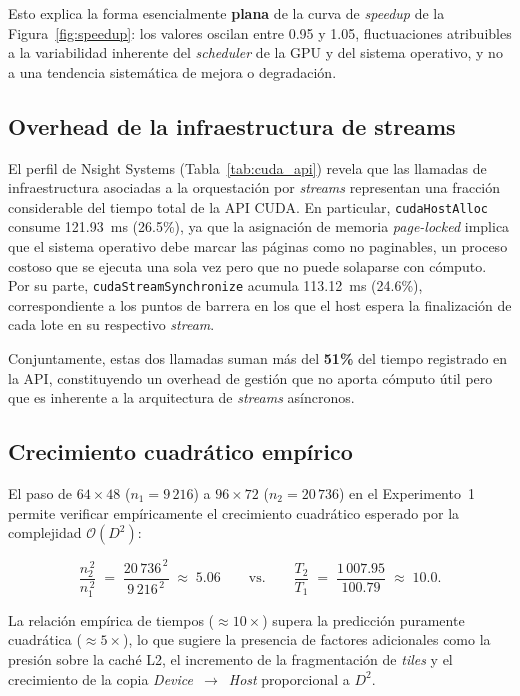 \documentclass[12pt, a4paper]{article}
\begin{document}
Esto explica la forma esencialmente \textbf{plana} de la curva de
\textit{speedup} de la Figura~\ref{fig:speedup}: los valores oscilan entre
0.95 y 1.05, fluctuaciones atribuibles a la variabilidad inherente del
\textit{scheduler} de la GPU y del sistema operativo, y no a una tendencia
sistemática de mejora o degradación.

\subsection{Overhead de la infraestructura de streams}

El perfil de Nsight Systems (Tabla~\ref{tab:cuda_api}) revela que las
llamadas de infraestructura asociadas a la orquestación por \textit{streams}
representan una fracción considerable del tiempo total de la API CUDA.
En particular, \texttt{cudaHostAlloc} consume 121.93~ms (26.5\%), ya que la
asignación de memoria \textit{page-locked} implica que el sistema operativo
debe marcar las páginas como no paginables, un proceso costoso que se ejecuta
una sola vez pero que no puede solaparse con cómputo. Por su parte,
\texttt{cudaStreamSynchronize} acumula 113.12~ms (24.6\%), correspondiente a
los puntos de barrera en los que el host espera la finalización de cada lote
en su respectivo \textit{stream}.

Conjuntamente, estas dos llamadas suman más del \textbf{51\%} del tiempo
registrado en la API, constituyendo un overhead de gestión que no aporta
cómputo útil pero que es inherente a la arquitectura de \textit{streams}
asíncronos.

\subsection{Crecimiento cuadrático empírico}

El paso de $64 \times 48$ ($n_1 = 9\,216$) a $96 \times 72$
($n_2 = 20\,736$) en el Experimento~1 permite verificar empíricamente el
crecimiento cuadrático esperado por la complejidad $\mathcal{O}(D^2)$:

\begin{equation}
    \frac{n_2^{\,2}}{n_1^{\,2}} \;=\;
    \frac{20\,736^{\,2}}{9\,216^{\,2}} \;\approx\; 5.06
    \qquad\text{vs.}\qquad
    \frac{T_2}{T_1} \;=\;
    \frac{1\,007.95}{100.79} \;\approx\; 10.0.
\end{equation}

La relación empírica de tiempos ($\approx 10{\times}$) supera la predicción
puramente cuadrática ($\approx 5{\times}$), lo que sugiere la presencia de
factores adicionales como la presión sobre la caché L2, el incremento de la
fragmentación de \textit{tiles} y el crecimiento de la copia
\textit{Device}~$\to$~\textit{Host} proporcional a $D^2$.
\end{document}
